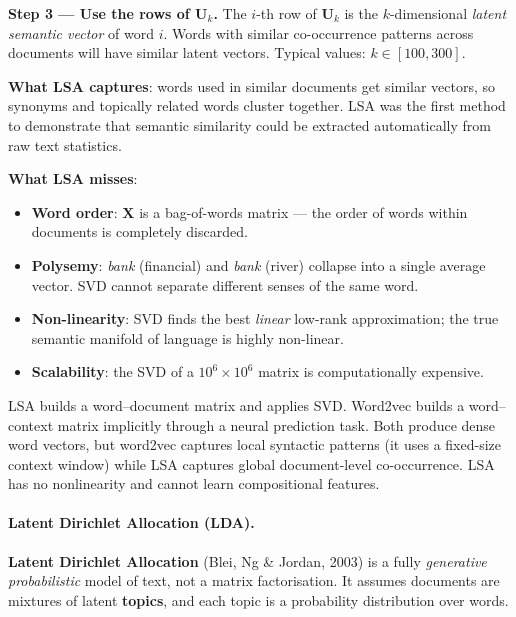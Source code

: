 \documentclass[11pt,a4paper]{article}
\newcommand{\term}[1]{\textcolor{DefGreen}{\textbf{#1}}\index{#1}}
\begin{document}
\textbf{Step 3 — Use the rows of $\mathbf{U}_k$.} The $i$-th row of $\mathbf{U}_k$ is the $k$-dimensional \emph{latent semantic vector} of word $i$. Words with similar co-occurrence patterns across documents will have similar latent vectors. Typical values: $k \in [100, 300]$.

\begin{insightbox}
\textbf{What LSA captures}: words used in similar documents get similar vectors, so synonyms and topically related words cluster together.  LSA was the first method to demonstrate that semantic similarity could be extracted automatically from raw text statistics.

\textbf{What LSA misses}:
\begin{itemize}
  \item \textbf{Word order}: $\mathbf{X}$ is a bag-of-words matrix — the order of words within documents is completely discarded.
  \item \textbf{Polysemy}: \textit{bank} (financial) and \textit{bank} (river) collapse into a single average vector. SVD cannot separate different senses of the same word.
  \item \textbf{Non-linearity}: SVD finds the best \emph{linear} low-rank approximation; the true semantic manifold of language is highly non-linear.
  \item \textbf{Scalability}: the SVD of a $10^6 \times 10^6$ matrix is computationally expensive.
\end{itemize}
\end{insightbox}

\begin{warnbox}
LSA builds a word--document matrix and applies SVD.  Word2vec builds a word--context matrix implicitly through a neural prediction task.  Both produce dense word vectors, but word2vec captures local syntactic patterns (it uses a fixed-size context window) while LSA captures global document-level co-occurrence.  LSA has no nonlinearity and cannot learn compositional features.
\end{warnbox}

\paragraph{Latent Dirichlet Allocation (LDA).}

\term{Latent Dirichlet Allocation} (Blei, Ng \& Jordan, 2003) is a fully \emph{generative probabilistic} model of text, not a matrix factorisation.  It assumes documents are mixtures of latent \textbf{topics}, and each topic is a probability distribution over words.
\end{document}
